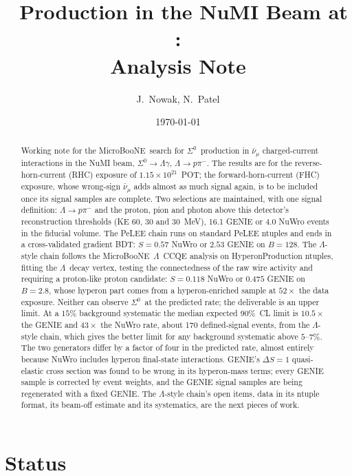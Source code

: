 \documentclass[11pt,a4paper]{article}
\title{\Szero\ Production in the NuMI Beam at \uboone:\\ Analysis Note}
\author{J.~Nowak, N.~Patel}
\date{\today}
\newcommand{\Szero}{\ensuremath{\Sigma^{0}}}
\newcommand{\Lam}{\ensuremath{\Lambda}}
\newcommand{\uboone}{MicroBooNE}
\newcommand{\numubar}{\ensuremath{\bar{\nu}_\mu}}
\begin{document}
\maketitle

\begin{abstract}
Working note for the \uboone\ search for \Szero\ production in $\numubar$
charged-current interactions in the NuMI beam, $\Szero\to\Lam\gamma$, $\Lam\to p\pi^-$.
The results are for the reverse-horn-current (RHC) exposure of $1.15\times10^{21}$~POT;
the forward-horn-current (FHC) exposure, whose wrong-sign $\numubar$ adds almost as much
signal again, is to be included once its signal samples are complete. Two selections are
maintained, with one signal definition: $\Lam\to p\pi^-$ and the proton, pion and photon
above this detector's reconstruction thresholds (KE $60$, $30$ and $30$~MeV), 16.1 GENIE or 4.0
NuWro events in the fiducial volume. The PeLEE chain runs on standard PeLEE ntuples and ends in
a cross-validated gradient BDT: $S=0.57$ NuWro or $2.53$ GENIE on $B=128$. The \Lam-style chain
follows the \uboone\ \Lam\ CCQE analysis on HyperonProduction ntuples, fitting the \Lam\ decay
vertex, testing the connectedness of the raw wire activity and requiring a proton-like proton
candidate: $S=0.118$ NuWro or $0.475$ GENIE on $B=2.8$, whose hyperon part comes from a
hyperon-enriched sample at $52\times$ the data exposure. Neither can observe \Szero\ at the
predicted rate; the deliverable is an upper limit. At a $15\%$ background systematic the median
expected 90\%~CL limit is $10.5\times$ the GENIE and $43\times$ the NuWro rate, about 170
defined-signal events, from the \Lam-style chain, which gives the better limit for any background
systematic above $5$--$7\%$. The two generators differ
by a factor of four in the predicted rate, almost entirely because NuWro includes hyperon
final-state interactions. GENIE's $\Delta S=1$ quasi-elastic cross section was found to be
wrong in its hyperon-mass terms; every GENIE sample is corrected by event weights, and the
GENIE signal samples are being regenerated with a fixed GENIE. The \Lam-style chain's open
items, data in its ntuple format, its beam-off estimate and its systematics, are the next
pieces of work.
\end{abstract}

\tableofcontents

\section{Status}
\label{sec:status}
\end{document}
